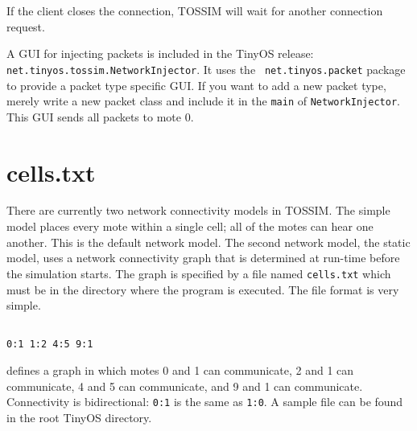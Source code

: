 \documentclass[12pt]{article}
\begin{document}
If the client closes the connection, TOSSIM will wait for another
connection request.

A GUI for injecting packets is included in the TinyOS release: {\tt
net.tinyos.tossim.NetworkInjector}. It uses the {\tt
net.tinyos.packet} package to provide a packet type specific GUI. If
you want to add a new packet type, merely write a new packet class and
include it in the {\tt main} of {\tt NetworkInjector}. This GUI sends
all packets to mote 0.

\section*{cells.txt}

There are currently two network connectivity models in TOSSIM. The simple model places every mote within a single cell; all of the motes can hear one another. This is the default network model. The second network model, the static model, uses a network connectivity graph that is determined at run-time before the simulation starts. The graph is specified by a file named {\tt cells.txt} which must be in the directory where the program is executed. The file format is very simple.

\begin{verbatim}

0:1 1:2 4:5 9:1

\end{verbatim}

defines a graph in which motes 0 and 1 can communicate, 2 and 1 can communicate, 4 and 5 can communicate, and 9 and 1 can communicate. Connectivity is bidirectional: {\tt 0:1} is the same as {\tt 1:0}. A sample file can be found in the root TinyOS directory.
\end{document}
